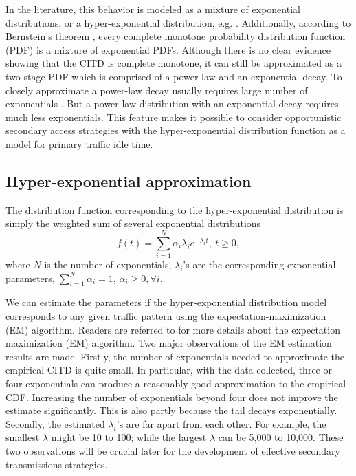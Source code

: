 \documentclass[10pt,final,journal,letterpaper]{IEEEtran}
\begin{document}
\par
In the literature, this behavior is modeled as a mixture of exponential distributions, or a hyper-exponential distribution, e.g. \cite{karagiannis2010power}. Additionally, according to Bernstein's theorem \cite{feller2008introduction}, every complete monotone probability distribution function (PDF) is a mixture of exponential PDFs. Although there is no clear evidence showing that the CITD is complete monotone, it can still be approximated as a two-stage PDF which is comprised of a power-law and an exponential decay. To closely approximate a power-law decay usually requires large number of exponentials \cite{feldmann1998fitting}. But a power-law distribution with an exponential decay requires much less exponentials. This feature makes it possible to consider opportunistic secondary access strategies with the hyper-exponential distribution function as a model for primary traffic idle time.

\subsection{Hyper-exponential approximation}\label{sec:3}
The distribution function corresponding to the hyper-exponential distribution is simply the weighted sum of several exponential distributions
\begin{equation}\label{eq:hyperexp}
    f(t)=\sum_{i=1}^{N}\alpha_i\lambda_ie^{-\lambda_it},\ t\geq 0,
\end{equation}
where $N$ is the number of exponentials, $\lambda_i$'s are the corresponding exponential parameters, $\sum_{i=1}^{N}\alpha_i=1$, $\alpha_i\geq 0,\forall i$.

\par
We can estimate the parameters if the hyper-exponential distribution model corresponds to any given traffic pattern using the expectation-maximization (EM) algorithm. Readers are referred to \cite{bilmes1998gentle} for more details about the expectation maximization (EM) algorithm. Two major observations of the EM estimation results are made. Firstly, the number of exponentials needed to approximate the empirical CITD is quite small. In particular, with the data collected, three or four exponentials can produce a reasonably good approximation to the empirical CDF. Increasing the number of exponentials beyond four does not improve the estimate significantly. This is also partly because the tail decays exponentially. Secondly, the estimated $\lambda_i$'s are far apart from each other. For example, the smallest $\lambda$ might be 10 to 100; while the largest $\lambda$ can be 5,000 to 10,000. These two observations will be crucial later for the development of effective secondary transmissions strategies.
\end{document}
